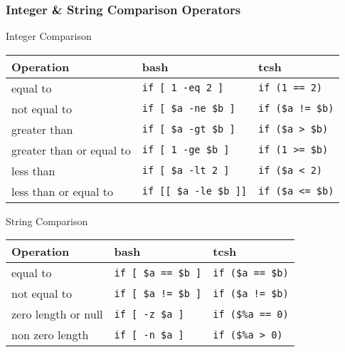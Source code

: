 \documentclass[10pt,t]{beamer}
\begin{document}
\begin{frame}
  \frametitle{Integer \& String Comparison Operators}
  \begin{exampleblock}{Integer Comparison}
    \begin{tabular}{lll}
      Operation & \textbf{bash} & \textbf{tcsh} \\
      \hline
      equal to & \texttt{if [ 1 -eq 2 ]} & \texttt{if (1 == 2)} \\
      not equal to & \texttt{if [ \$a -ne \$b ]} & \texttt{if (\$a != \$b)}\\
      greater than & \texttt{if [ \$a -gt \$b ]} & \texttt{if (\$a > \$b)}\\
      greater than or equal to & \texttt{if [ 1 -ge \$b ]} & \texttt{if (1 >= \$b)}\\
      less than & \texttt{if [ \$a -lt 2 ]} & \texttt{if (\$a < 2)}\\
      less than or equal to & \texttt{if [[ \$a -le \$b ]]} & \texttt{if (\$a <= \$b)} \\
      \hline
    \end{tabular}
  \end{exampleblock}
  \begin{exampleblock}{String Comparison}
    \begin{tabular}{lll}
      Operation & \textbf{bash} & \textbf{tcsh} \\
      \hline
      equal to & \texttt{if [ \$a == \$b ]} & \texttt{if (\$a == \$b)}\\
      not equal to & \texttt{if [ \$a != \$b ]} & \texttt{if (\$a != \$b)}\\
      zero length or null & \texttt{if [ -z \$a ] } & \texttt{if (\$\%a == 0)}\\
      non zero length & \texttt{if [ -n \$a ] } & \texttt{if (\$\%a > 0)}\\
      \hline
    \end{tabular}
  \end{exampleblock}
\end{frame}
\end{document}
